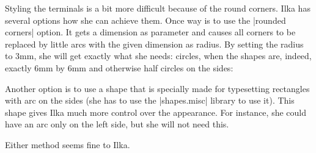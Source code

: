 Styling the terminals is a bit more difficult because of the round
corners. Ilka has several options how she can achieve them. Once way
is to use the |rounded corners| option. It gets a dimension as
parameter and causes all corners to be replaced by little arcs with
the given dimension as radius. By setting the radius to 3mm, she will
get exactly what she needs: circles, when the shapes are, indeed,
exactly 6mm by 6mm and otherwise half circles on the sides:

\begin{codeexample}[]
\end{codeexample}

Another option is to use a shape that is specially made for
typesetting rectangles with arc on the sides (she has to use the
|shapes.misc| library to use it). This shape gives Ilka
much more control over the appearance. For instance, she could have an
arc only on the left side, but she will not need this.
\begin{codeexample}[]
\end{codeexample}
Either method seems fine to Ilka.

